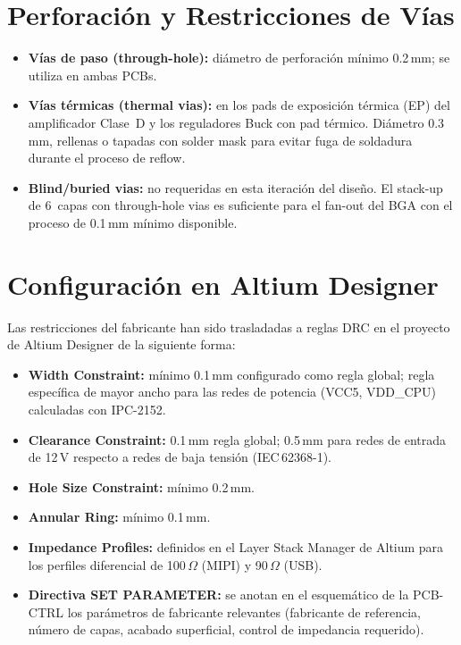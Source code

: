 \section{Perforación y Restricciones de Vías}
\label{sec:fab_vias}

\begin{itemize}
  \item \textbf{Vías de paso (through-hole):} diámetro de perforación mínimo
    0.2\,mm; se utiliza en ambas PCBs.
  \item \textbf{Vías térmicas (thermal vias):} en los pads de exposición térmica
    (EP) del amplificador Clase~D y los reguladores Buck con pad térmico. Diámetro
    0.3\,mm, rellenas o tapadas con solder mask para evitar fuga de soldadura
    durante el proceso de reflow.
  \item \textbf{Blind/buried vias:} no requeridas en esta iteración del diseño.
    El stack-up de 6~capas con through-hole vias es suficiente para el fan-out del
    BGA con el proceso de 0.1\,mm mínimo disponible.
\end{itemize}

\section{Configuración en Altium Designer}
\label{sec:fab_altium}

Las restricciones del fabricante han sido trasladadas a reglas DRC en el proyecto
de Altium Designer de la siguiente forma:

\begin{itemize}
  \item \textbf{Width Constraint:} mínimo 0.1\,mm configurado como regla global;
    regla específica de mayor ancho para las redes de potencia (VCC5, VDD\_CPU)
    calculadas con IPC-2152.
  \item \textbf{Clearance Constraint:} 0.1\,mm regla global; 0.5\,mm para redes
    de entrada de 12\,V respecto a redes de baja tensión (IEC\,62368-1).
  \item \textbf{Hole Size Constraint:} mínimo 0.2\,mm.
  \item \textbf{Annular Ring:} mínimo 0.1\,mm.
  \item \textbf{Impedance Profiles:} definidos en el Layer Stack Manager de Altium
    para los perfiles diferencial de 100\,$\Omega$ (MIPI) y 90\,$\Omega$ (USB).
  \item \textbf{Directiva SET PARAMETER:} se anotan en el esquemático de la
    PCB-CTRL los parámetros de fabricante relevantes (fabricante de referencia,
    número de capas, acabado superficial, control de impedancia requerido).
\end{itemize}
